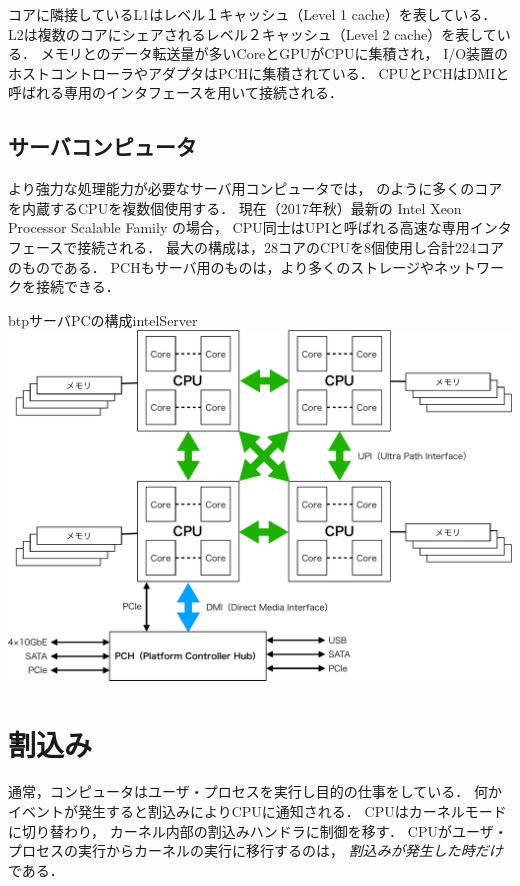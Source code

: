 コアに隣接しているL1はレベル１キャッシュ（Level 1 cache）を表している．
L2は複数のコアにシェアされるレベル２キャッシュ（Level 2 cache）を表している．
メモリとのデータ転送量が多いCoreとGPUがCPUに集積され，
I/O装置のホストコントローラやアダプタはPCHに集積されている．
CPUとPCHはDMIと呼ばれる専用のインタフェースを用いて接続される．

\subsection{サーバコンピュータ}
より強力な処理能力が必要なサーバ用コンピュータでは，
のように多くのコアを内蔵するCPUを複数個使用する．
現在（2017年秋）最新の Intel Xeon Processor Scalable Family の場合，
CPU同士はUPIと呼ばれる高速な専用インタフェースで接続される．
最大の構成は，28コアのCPUを8個使用し合計224コアのものである．
PCHもサーバ用のものは，より多くのストレージやネットワークを接続できる．

\begin{myfig}{btp}{サーバPCの構成}{intelServer}
  \includegraphics[scale=0.6]{Fig/intelServer-crop.pdf}
\end{myfig}

\section{割込み}
\label{interruptSource}
通常，コンピュータはユーザ・プロセスを実行し目的の仕事をしている．
何かイベントが発生すると割込みによりCPUに通知される．
CPUはカーネルモードに切り替わり，
カーネル内部の割込みハンドラに制御を移す．
CPUがユーザ・プロセスの実行からカーネルの実行に移行するのは，
\emph{割込みが発生した時だけ}である．

